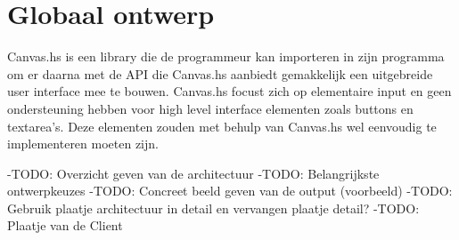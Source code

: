 \section{Globaal ontwerp}  \label{sec:globaal}
Canvas.hs is een library die de programmeur kan importeren in zijn programma om er daarna met de API die Canvas.hs aanbiedt gemakkelijk een uitgebreide user interface mee te bouwen. Canvas.hs focust zich op elementaire input en geen ondersteuning hebben voor high level interface elementen zoals buttons en textarea's. Deze elementen zouden met behulp van Canvas.hs wel eenvoudig te implementeren moeten zijn.

-TODO: Overzicht geven van de architectuur
-TODO: Belangrijkste ontwerpkeuzes
-TODO: Concreet beeld geven van de output (voorbeeld)
-TODO: Gebruik plaatje architectuur in detail en vervangen plaatje detail?
-TODO: Plaatje van de Client
